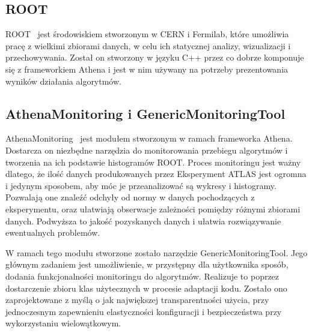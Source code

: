 \subsection{ROOT}
ROOT~\cite{cern-root} jest środowiskiem stworzonym w CERN i Fermilab, które umożliwia pracę z wielkimi zbiorami danych, w celu ich statycznej analizy, wizualizacji i przechowywania. 
Został on stworzony w języku C++ przez co dobrze komponuje się z frameworkiem Athena i jest w nim używany na potrzeby prezentowania wyników działania algorytmów. 

\subsection{AthenaMonitoring i GenericMonitoringTool}
AthenaMonitoring~\cite{atlas-athena-monitoring} jest modułem stworzonym w ramach frameworka Athena.
Dostarcza on niezbędne narzędzia do monitorowania przebiegu algorytmów i tworzenia na ich podstawie histogramów ROOT.
Proces monitoringu jest ważny dlatego, że ilość danych produkowanych przez Eksperyment ATLAS jest ogromna i jedynym sposobem, aby móc je przeanalizować są wykresy i histogramy.
Pozwalają one znaleźć odchyły od normy w danych pochodzących z eksperymentu, oraz ułatwiają obserwacje zależności pomiędzy różnymi zbiorami danych.
Podwyższa to jakość pozyskanych danych i ułatwia rozwiązywanie ewentualnych problemów.

W ramach tego modułu stworzone zostało narzędzie GenericMonitoringTool. 
Jego głównym zadaniem jest umożliwienie, w przystępny dla użytkownika sposób, dodania funkcjonalności monitoringu do algorytmów.
Realizuje to poprzez dostarczenie zbioru klas użytecznych w procesie adaptacji kodu. 
Zostało ono zaprojektowane z myślą o jak największej transparentności użycia, przy jednoczesnym zapewnieniu elastyczności konfiguracji i bezpieczeństwa przy wykorzystaniu wielowątkowym.
